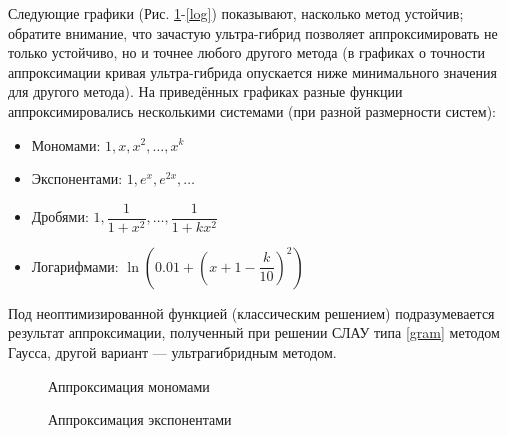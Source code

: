 \documentclass[a4paper, 12pt]{article}
\begin{document}
Следующие графики (Рис. \ref{monex}-\ref{log}) показывают, насколько метод устойчив;
обратите внимание, что зачастую ультра-гибрид позволяет аппроксимировать не только устойчиво,
но и точнее любого другого метода (в графиках о точности аппроксимации кривая ультра-гибрида опускается ниже минимального значения для другого метода).
На приведённых графиках разные функции аппроксимировались несколькими системами (при разной размерности систем):
\begin{itemize}
  \item Мономами: $1, x, x^2,\dots , x^k$
  \item Экспонентами: $1, e^x, e^{2x},\dots$
  \item Дробями: $1,\dfrac{1}{1+x^2}, \dots , \dfrac{1}{1+kx^2}$
  \item Логарифмами: $\ln\left(0.01 + \left(x+1-\dfrac{k}{10}\right)^2\right)$
\end{itemize}
Под неоптимизированной функцией (классическим решением) подразумевается результат аппроксимации, полученный при решении СЛАУ типа \ref{gram} методом Гаусса, другой вариант --- ультрагибридным методом.

\begin{figure}[h!]
  \noindent{}
 \caption{Аппроксимация мономами}
  \label{monex}
\end{figure}

\begin{figure}[h!]
  \noindent{}
 \caption{Аппроксимация экспонентами}
  \label{expex}
\end{figure}
\end{document}

